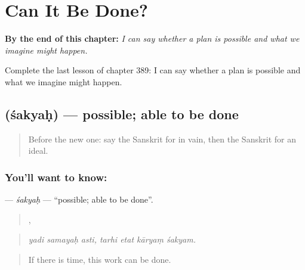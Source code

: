 
\chapter{Can It Be Done?}
\label{ch:sa-can-it-be-done}

\begin{chapteropening}
\textbf{By the end of this chapter:} \emph{I can say whether a plan is possible and what we imagine might happen.}

Complete the last lesson of chapter 389: I can say whether a plan is possible and what we imagine might happen.
\end{chapteropening}

\section[\texorpdfstring{\sk{शक्यः} (śakyaḥ)}{शक्यः (śakyaḥ)}]{ (śakyaḥ) — possible; able to be done}

\label{lesson:SA-C389-sakyah}



\begin{quote}
Before the new one: say the Sanskrit for in vain, then the Sanskrit for an ideal.
\end{quote}

\subsection*{You'll want to know: }
\textbf{} — \emph{śakyaḥ} — \textquotedblleft{}possible; able to be done\textquotedblright{}.

\begin{quote}
  ,    
\end{quote}

\begin{quote}
\emph{yadi samayaḥ asti, tarhi etat kāryaṃ śakyam.}
\end{quote}

\begin{quote}
If there is time, this work can be done.
\end{quote}

